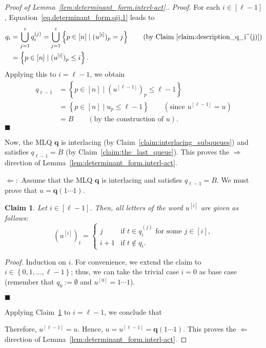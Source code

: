 \documentclass[reqno]{amsart}
\newcommand{\0}{\phantom{c}}
\newcommand{\qq}{\mathbf{q}}
\let\cupnonlimits\bigcup
\renewcommand{\bigcup}{\cupnonlimits\limits}
\newenvironment{subproof}{\textit{Proof.} }{\hfill$\blacksquare$\medskip}
\newcommand{\set}[1]{\left\{ #1 \right\}}
\newcommand{\ive}[1]{\left[ #1 \right]}
\theoremstyle{plain}
\newtheorem{claim}[thm]{Claim}
\theoremstyle{definition}
\numberwithin{equation}{section}
\newcommand{\Darij}[1]{\todo[size=\tiny,inline,color=red!30]{#1
      \\ \hfill --- Darij}}
\begin{document}
\begin{proof}[Proof of Lemma~\ref{lem:determinant_form.interl-act}.]
\begin{subproof}
For each $i \in \ive{\ell-1}$, Equation~\eqref{eq.determinant_form.qij.1} leads to
\begin{align*}
  q_i & = \bigcup_{j=1}^i q_i^{(j)} = \bigcup_{j=1}^i \set{ p \in \ive{n} \mid ( u^{\left[  i\right] } )_p = j }
            \qquad \text{(by Claim~\ref{claim:description_q_i^(j)})} \\
      &= \set{ p \in \ive{n} \mid ( u^{\left[  i\right] } )_p \leq i } .
\end{align*}
Applying this to $i = \ell-1$, we obtain
\begin{align*}
  q_{\ell-1}
  &= \set{ p \in \ive{n} \mid ( u^{\left[\ell-1\right] } )_p \leq \ell-1 } \\
  &= \set{ p \in \ive{n} \mid u_p \leq \ell-1 }
   \qquad \left(\text{since } u^{\left[  \ell-1\right]  } = u \right) \\
  &= B \qquad \left(\text{by the construction of }u\right) .
\end{align*}
\end{subproof}

Now, the MLQ $\qq$ is interlacing (by Claim~\ref{claim:interlacing_subqueues}) and satisfies $q_{\ell-1} = B$ (by Claim~\ref{claim:the_last_queue}).
This proves the $\Longrightarrow$ direction of Lemma~\ref{lem:determinant_form.interl-act}.

$\Longleftarrow:$
Assume that the MLQ $\qq$ is interlacing and satisfies $q_{\ell-1} = B$.
We must prove that $u = \qq(1 \cdots 1)$.

\begin{claim}
\label{claim:describing_u^[i]}
Let $i \in \ive{\ell-1}$. Then, all letters of the
word $u^{\left[  i\right]}$ are given as follows:
\[
\left( u^{\left[  i\right]} \right)_t =
\begin{cases}
j & \text{if } t \in q_i^{(j)} \text{ for some } j \in\ive{i}\!, \\
i+1 & \text{if } t \notin q_i.
\end{cases}
\]
\end{claim}

\begin{subproof}
Induction on $i$.
For convenience, we extend the claim to $i \in \set{0, 1, \ldots, \ell-1}$;
thus, we can take the trivial case $i = 0$ as base case
(remember that $q_0 := \emptyset$ and $u^{\left[  0\right]} = 1\dotsm1$).

\Darij{TODO}
\end{subproof}

Applying Claim~\ref{claim:describing_u^[i]} to $i=\ell-1$, we conclude that
\Darij{TODO.}

Therefore, $u^{\left[\ell-1\right]} = u$.
Hence, $u = u^{\left[\ell-1\right]} = \qq(1 \cdots 1)$.
This proves the $\Longleftarrow$ direction of Lemma~\ref{lem:determinant_form.interl-act}.
\end{proof}
\end{document}
